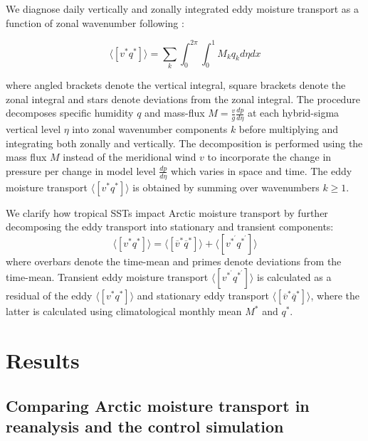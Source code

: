 \documentclass[draft]{agujournal2019}
\begin{document}
We diagnose daily vertically and zonally integrated eddy moisture transport as a function of zonal wavenumber following : 

$$
\langle [v^{*}q^{*}] \rangle  =  \sum_{k}  \int_{0}^{2\pi} \int_{0}^{1}   M_{k}  q_{k} d\eta dx
$$ 

\noindent
where angled brackets denote the vertical integral, square brackets denote the zonal integral and stars denote deviations from the zonal integral. The procedure decomposes specific humidity $q$ and mass-flux $M = \frac{v}{g}\frac{dp}{d\eta} $ at each hybrid-sigma vertical level $\eta$ into zonal wavenumber components $k$ before multiplying and integrating both zonally and vertically. The decomposition is performed using the mass flux $M$ instead of the meridional wind $v$ to incorporate the change in pressure per change in model level $\frac{dp}{d\eta}$ which varies in space and time. The eddy moisture transport $ \langle [v^{*}q^{*}] \rangle$ is obtained by summing over wavenumbers $k \ge 1$. 

 





We clarify how tropical SSTs impact Arctic moisture transport by further decomposing the eddy transport into stationary and transient components: 
$$
\langle [v^{*}q^{*}] \rangle   =   \langle [\overline{v}^{*} \overline{q}^{*}] \rangle +  \langle [v^{*^{\prime}} q^{*^{\prime}}] \rangle
$$
where overbars denote the time-mean and primes denote deviations from the time-mean. Transient eddy moisture transport $ \langle [v^{*^{\prime}} q^{*^{\prime}}] \rangle$ is calculated as a residual of the eddy $ \langle [v^{*}q^{*}] \rangle$ and stationary eddy transport $ \langle [\overline{v}^{*} \overline{q}^{*}] \rangle$, where the latter is calculated using climatological monthly mean $M^{*}$ and $q^{*}$. 




\section{Results}

\subsection{Comparing Arctic moisture transport in reanalysis and the control simulation}
\end{document}

